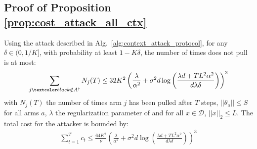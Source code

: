 
\subsection{Proof of Proposition \ref{prop:cost_attack_all_ctx}}\label{app:proof_attack_all_ctx}

\begin{prop*}
Using the attack described in Alg.~\ref{alg:context_attack_protocol}, for any $\delta\in (0, 1/K]$, with probability at least $1 - K\delta$, the number of times \linucb does not pull  is at most:
\begin{align*}
    \sum_{j\changelm{\notin A^{\dagger}}} N_{j}(T) \leq 32K^{2}\left( \frac{\lambda}{\alpha^{2}} + \sigma^{2}d\log\left(\frac{\lambda d + TL^2\alpha^{2}}{d\lambda\delta}\right) \right)^{3}
\end{align*}
with $N_{j}(T)$ the number of times arm $j$ has been pulled after $T$ steps, $|| \theta_{a}|| \leq S$ for all arms $a$, $\lambda$ the regularization parameter of \linucb and for all $x\in \mathcal{D}$, $||x||_{2}\leq L$. The total cost for the attacker is bounded by:
\begin{align*}
    \sum_{t=1}^{T} c_{t} \leq \frac{64K^{2}}{\nu}\left( \frac{\lambda}{\alpha^{2}} + \sigma^{2}d\log\left(\frac{\lambda d + TL^2\alpha^{2}}{d\lambda\delta}\right) \right)^{3}
\end{align*}
\end{prop*}

